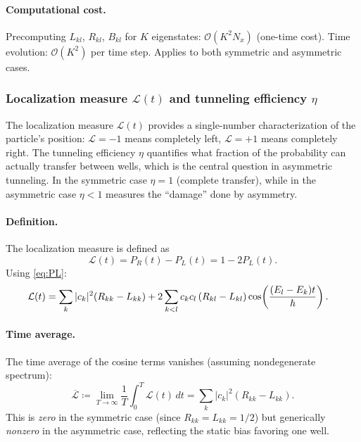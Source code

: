\paragraph{Computational cost.}
Precomputing $L_{kl}$, $R_{kl}$, $B_{kl}$ for $K$ eigenstates: $\mathcal{O}(K^2 N_x)$ (one-time cost).
Time evolution: $\mathcal{O}(K^2)$ per time step.
Applies to both symmetric and asymmetric cases.

\subsubsection{Localization measure $\mathcal{L}(t)$ and tunneling efficiency $\eta$}\label{sec:localization}

\begin{remark}
The localization measure $\mathcal{L}(t)$ provides a single-number characterization of the particle's position: $\mathcal{L} = -1$ means completely left, $\mathcal{L} = +1$ means completely right.
The tunneling efficiency $\eta$ quantifies what fraction of the probability can actually transfer between wells, which is the central question in asymmetric tunneling.
In the symmetric case $\eta = 1$ (complete transfer), while in the asymmetric case $\eta < 1$ measures the ``damage'' done by asymmetry.
\end{remark}

\paragraph{Definition.}

The localization measure is defined as
\begin{equation}\label{eq:localization}
  \mathcal{L}(t) = P_R(t) - P_L(t) = 1 - 2P_L(t).
\end{equation}
Using \cref{eq:PL}:
\begin{align}
  \mathcal{L}(t)
  &= \sum_k |c_k|^2(R_{kk} - L_{kk})
  + 2\sum_{k<l} c_k c_l\,(R_{kl} - L_{kl})\cos\!\left(\frac{(E_l - E_k)t}{\hbar}\right).
  \label{eq:L_full}
\end{align}

\paragraph{Time average.}

The time average of the cosine terms vanishes (assuming nondegenerate spectrum):
\begin{equation}\label{eq:L_time_avg}
  \overline{\mathcal{L}} \coloneqq \lim_{T\to\infty}\frac{1}{T}\int_0^T \mathcal{L}(t)\,dt
  = \sum_k |c_k|^2(R_{kk} - L_{kk}).
\end{equation}
This is \emph{zero} in the symmetric case (since $R_{kk} = L_{kk} = 1/2$) but generically \emph{nonzero} in the asymmetric case, reflecting the static bias favoring one well.

